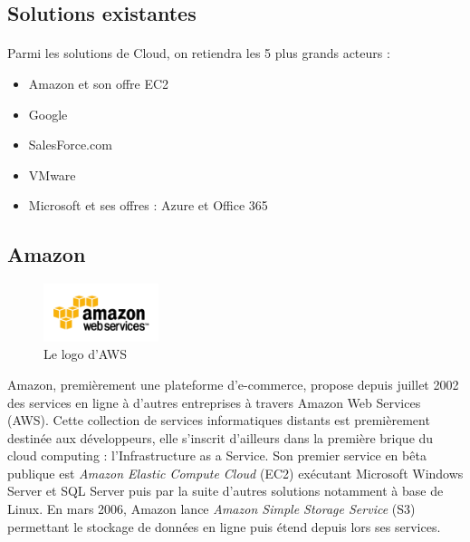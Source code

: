\documentclass[a4paper,12pt]{report}
\begin{document}
\begin{onehalfspace}
	\newpage
	
	\section{Solutions existantes}
	
	\paragraph*{}
	Parmi les solutions de Cloud, on retiendra les 5 plus grands acteurs : 
	\begin{itemize}
		\item Amazon et son offre EC2
		\item Google
		\item SalesForce.com
		\item VMware
		\item Microsoft et ses offres : Azure et Office 365
	\end{itemize}
	
	
	\subsection{Amazon}
		\begin{figure}
			\centering
			\includegraphics[width=0.3\textwidth]{aws.png} 
			\caption{Le logo d'AWS}
		\end{figure}

Amazon, premièrement une plateforme d'e-commerce, propose depuis juillet 2002 des services en ligne à d'autres entreprises à travers Amazon Web Services (AWS). Cette collection de services informatiques distants est premièrement destinée aux développeurs, elle s'inscrit d'ailleurs dans la première brique du cloud computing : l'Infrastructure as a Service. Son premier service en bêta publique est \textit{Amazon Elastic Compute Cloud} (EC2) exécutant Microsoft Windows Server et SQL Server puis par la suite d'autres solutions notamment à base de Linux.
 En mars 2006, Amazon lance \textit{Amazon Simple Storage Service} (S3) permettant le stockage de données en ligne puis étend depuis lors ses services.
	

\end{onehalfspace}
\end{document}
